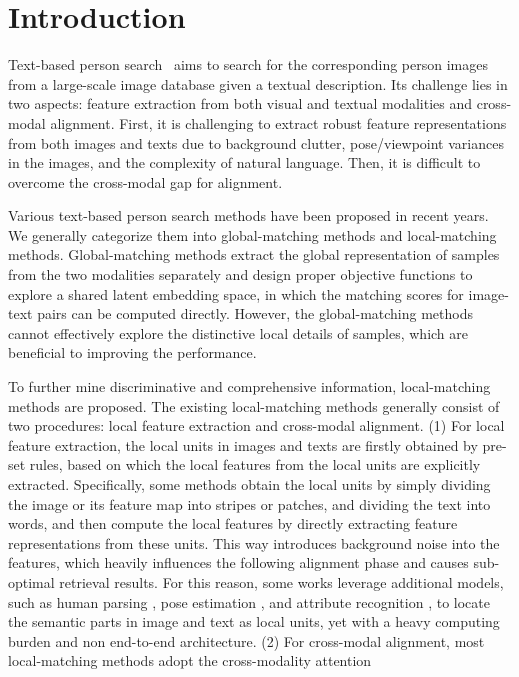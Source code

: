 \documentclass{article}
\begin{document}
\section{Introduction}
\label{sec:intro}
Text-based person search~\cite{li2017person} aims to search for the corresponding person images from a large-scale image database given a textual description. Its challenge lies in two aspects: feature extraction from both visual and textual modalities and cross-modal alignment. First, it is challenging to extract robust feature representations from both images and texts due to background clutter, pose/viewpoint variances in the images, and the complexity of natural language. Then, it is difficult to overcome the cross-modal gap for alignment.
\par
Various text-based person search methods have been proposed in recent years. We generally categorize them into global-matching methods and local-matching methods. Global-matching methods \cite{wang2019language,zheng2020dual,li2017person,li2017identity,zhang2018deep} extract the global representation of samples from the two modalities separately and design proper objective functions to explore a shared latent embedding space, in which the matching scores for image-text pairs can be computed directly. However, the global-matching methods cannot effectively explore the distinctive local details of samples, which are beneficial to improving the performance. 
\par To further mine discriminative and comprehensive information, local-matching methods are proposed. The existing local-matching methods \cite{wang2020vitaa,zheng2020hierarchical,wangtext,aggarwal2020text,jing2020pose,niu2020improving,chen2018improving} generally consist of two procedures: local feature extraction and cross-modal alignment. (1) For local feature extraction, the local units in images and texts are firstly obtained by pre-set rules, based on which the local features from the local units are explicitly extracted. Specifically, some methods \cite{niu2020improving,zheng2020hierarchical} obtain the local units by simply dividing the image or its feature map into stripes or patches, and dividing the text into words, and then compute the local features by directly extracting feature representations from these units. This way introduces background noise into the features, which heavily influences the following alignment phase and causes sub-optimal retrieval results.  For this reason, some works leverage additional models, such as human parsing \cite{wang2020vitaa}, pose estimation \cite{jing2020pose}, and attribute recognition \cite{aggarwal2020text}, to locate the semantic parts in image and text as local units, yet with a heavy computing burden and non end-to-end architecture. (2) For cross-modal alignment, most local-matching methods \cite{jing2020pose,niu2020improving,10.1145/3343031.3350991,chen2018improving} adopt the cross-modality attention 
\end{document}
